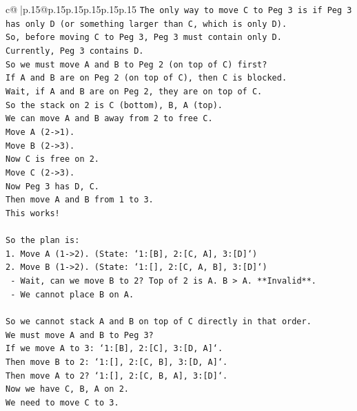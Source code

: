 \documentclass{article}
\begin{document}
{\begin{supertabular}{c@{$\;$}|p{.15\linewidth}@{}p{.15\linewidth}p{.15\linewidth}p{.15\linewidth}p{.15\linewidth}p{.15\linewidth}}
{{{\texttt{The only way to move C to Peg 3 is if Peg 3 has only D (or something larger than C, which is only D).} \\
\texttt{So, before moving C to Peg 3, Peg 3 must contain only D.} \\
\texttt{Currently, Peg 3 contains D.} \\
\texttt{So we must move A and B to Peg 2 (on top of C) first?} \\
\texttt{If A and B are on Peg 2 (on top of C), then C is blocked.} \\
\texttt{Wait, if A and B are on Peg 2, they are on top of C.} \\
\texttt{So the stack on 2 is C (bottom), B, A (top).} \\
\texttt{We can move A and B away from 2 to free C.} \\
\texttt{Move A (2{-}>1).} \\
\texttt{Move B (2{-}>3).} \\
\texttt{Now C is free on 2.} \\
\texttt{Move C (2{-}>3).} \\
\texttt{Now Peg 3 has D, C.} \\
\texttt{Then move A and B from 1 to 3.} \\
\texttt{This works!} \\
\\ 
\texttt{So the plan is:} \\
\texttt{1. Move A (1{-}>2). (State: `1:{[}B{]}, 2:{[}C, A{]}, 3:{[}D{]}`)} \\
\texttt{2. Move B (1{-}>2). (State: `1:{[}{]}, 2:{[}C, A, B{]}, 3:{[}D{]}`)} \\
\texttt{   {-} Wait, can we move B to 2? Top of 2 is A. B > A. **Invalid**.} \\
\texttt{   {-} We cannot place B on A.} \\
\\ 
\texttt{So we cannot stack A and B on top of C directly in that order.} \\
\texttt{We must move A and B to Peg 3?} \\
\texttt{If we move A to 3: `1:{[}B{]}, 2:{[}C{]}, 3:{[}D, A{]}`.} \\
\texttt{Then move B to 2: `1:{[}{]}, 2:{[}C, B{]}, 3:{[}D, A{]}`.} \\
\texttt{Then move A to 2? `1:{[}{]}, 2:{[}C, B, A{]}, 3:{[}D{]}`.} \\
\texttt{Now we have C, B, A on 2.} \\
\texttt{We need to move C to 3.} \\
}}}
\end{supertabular}}
\end{document}
